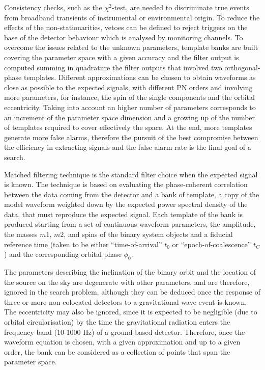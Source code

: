 \documentclass[binding=0.6cm, LaM]{sapthesis}
\begin{document}
	Consistency checks, such as the $\chi^2$-test, 
	are needed to discriminate true events from broadband transients 
	of instrumental or environmental origin. 
	To reduce the effects of the non-stationarities, 
	vetoes can be defined to reject triggers on the base of the detector behaviour 
	which is analysed by monitoring channels. 
	To overcome the issues related to the unknown parameters, 
	template banks are built covering the parameter space with a given accuracy and 
	the filter output is computed summing in quadrature the filter outputs that involved two orthogonal-phase templates. 
	Different approximations can be chosen to obtain waveforms as close as possible to the expected signals, 
	with different PN orders and involving more parameters, 
	for instance, the spin of the single components and the orbital eccentricity. 
	Taking into account an higher number of parameters corresponds to an increment of the parameter space dimension 
	and a growing up of the number of templates required to cover effectively the space. 
	At the end, more templates generate more false alarms, 
	therefore the pursuit of the best compromise between the efficiency in extracting signals 
	and the false alarm rate is the final goal of a search. 
	
	Matched filtering technique is the standard filter choice when the expected signal is known. 
	The technique is based on evaluating the phase-coherent correlation between the data 
	coming from the detector and a bank of template, 
	a copy of the model waveform weighted down by the expected power spectral density of the data, 
	that must reproduce the expected signal. 
	Each template of the bank is produced starting from a set of continuous waveform parameters, 
	the amplitude, the masses $m1$, $m2$, and spins of the binary system objects and a fiducial reference time 
	(taken to be either “time-of-arrival” $t_0$ or “epoch-of-coalescence” $t_C$) and the corresponding orbital phase $\phi_0$. 

	The parameters describing the inclination of the binary orbit and 
	the location of the source on the sky are degenerate with other parameters, 
	and are therefore, ignored in the search problem, 
	although they can be deduced once the response of three or more non-colocated detectors 
	to a gravitational wave event is known. 
	The eccentricity may also be ignored, since it is expected to be negligible 
	(due to orbital circularisation) by the time the gravitational radiation enters the frequency band 
	(10-1000 Hz) of a ground-based detector. 
	Therefore, once the waveform equation is chosen, 
	with a given approximation and up to a given order, 
	the bank can be considered as a collection of points that span the parameter space.
	
\end{document}
